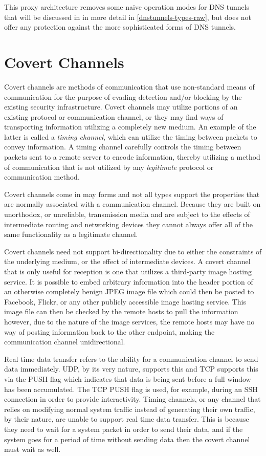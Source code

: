 \documentclass[12pt]{report}
\theoremstyle{remark}
\theoremstyle{definition}
\theoremstyle{definition}
\theoremstyle{definition}
\begin{document}
This proxy architecture removes some naive operation modes for DNS tunnels that
will be discussed in in more detail in \ref{dnstunnels-types-raw}, but does not
offer any protection against the more sophisticated forms of DNS tunnels.

\section{Covert Channels}

Covert channels are methods of communication that use non-standard means of
communication for the purpose of evading detection and/or blocking by the
existing security infrastructure. Covert channels may utilize portions of an
existing protocol or communication channel, or they may find ways of
transporting information utilizing a completely new medium. An example of the
latter is called a \emph{timing channel}, which can utilize the timing between
packets to convey information. A timing channel carefully controls the timing
between packets sent to a remote server to encode information, thereby utilizing
a method of communication that is not utilized by any \emph{legitimate} protocol
or communication method.

Covert channels come in may forms and not all types support the properties that
are normally associated with a communication channel. Because they are built on
unorthodox, or unreliable, transmission media and are subject to the effects of
intermediate routing and networking devices they cannot always offer all of the
same functionality as a legitimate channel.

Covert channels need not support bi-directionality due to either the constraints
of the underlying medium, or the effect of intermediate devices. A covert
channel that is only useful for reception is one that utilizes a third-party
image hosting service. It is possible to embed arbitrary information into the
header portion of an otherwise completely benign JPEG image file which could
then be posted to Facebook, Flickr, or any other publicly accessible image
hosting service. This image file can then be checked by the remote hosts to pull
the information however, due to the nature of the image services, the remote
hosts may have no way of posting information back to the other endpoint, making
the communication channel unidirectional.

Real time data transfer refers to the ability for a communication channel to
send data immediately. UDP, by its very nature, supports this and TCP supports
this via the PUSH flag which indicates that data is being sent before a full
window has been accumulated. The TCP PUSH flag is used, for example, during an
SSH connection in order to provide interactivity. Timing channels, or any
channel that relies on modifying normal system traffic instead of generating
their own traffic, by their nature, are unable to support real time data
transfer. This is because they need to wait for a system packet in order to send
their data, and if the system goes for a period of time without sending data
then the covert channel must wait as well.
\end{document}
